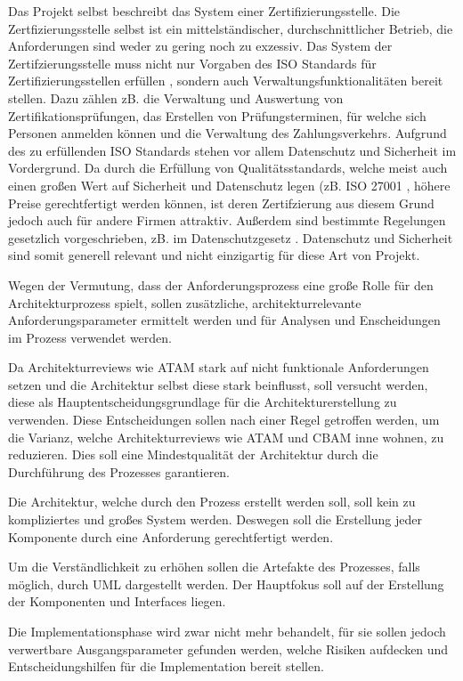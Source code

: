 Das Projekt selbst beschreibt das System einer Zertifizierungsstelle. Die Zertfizierungsstelle selbst ist ein mittelständischer, durchschnittlicher Betrieb, die Anforderungen sind weder zu gering noch zu exzessiv. Das System der Zertifzierungsstelle muss nicht nur Vorgaben des ISO Standards für Zertifizierungsstellen erfüllen \cite{ISO_CERT}, sondern auch Verwaltungsfunktionalitäten bereit stellen. Dazu zählen zB. die Verwaltung und Auswertung von Zertifikationsprüfungen, das Erstellen von Prüfungsterminen, für welche sich Personen anmelden können und die Verwaltung des Zahlungsverkehrs. Aufgrund des zu erfüllenden ISO Standards stehen vor allem Datenschutz und Sicherheit im Vordergrund. Da durch die Erfüllung von Qualitätsstandards, welche meist auch einen großen Wert auf Sicherheit und Datenschutz legen (zB. ISO 27001 \cite{ISO_SEC}, höhere Preise gerechtfertigt werden können, ist deren Zertifzierung aus diesem Grund jedoch auch für andere Firmen attraktiv. Außerdem sind bestimmte Regelungen gesetzlich vorgeschrieben, zB. im Datenschutzgesetz \cite[§ 14]{datenschutz}. Datenschutz und Sicherheit sind somit generell relevant und nicht einzigartig für diese Art von Projekt.

Wegen der Vermutung, dass der Anforderungsprozess eine große Rolle für den Architekturprozess spielt, sollen zusätzliche, architekturrelevante Anforderungsparameter ermittelt werden und für Analysen und Enscheidungen im Prozess verwendet werden.

Da Architekturreviews wie ATAM stark auf nicht funktionale Anforderungen setzen und die Architektur selbst diese stark beinflusst, soll versucht werden, diese als Hauptentscheidungsgrundlage für die Architekturerstellung zu verwenden. Diese Entscheidungen sollen nach einer Regel getroffen werden, um die Varianz, welche Architekturreviews wie ATAM und CBAM inne wohnen, zu reduzieren. Dies soll eine Mindestqualität der Architektur durch die Durchführung des Prozesses garantieren.

Die Architektur, welche durch den Prozess erstellt werden soll, soll kein zu kompliziertes und großes System werden. Deswegen soll die Erstellung jeder Komponente durch eine Anforderung gerechtfertigt werden.

Um die Verständlichkeit zu erhöhen sollen die Artefakte des Prozesses, falls möglich, durch UML dargestellt werden. Der Hauptfokus soll auf der Erstellung der Komponenten und Interfaces liegen.

Die Implementationsphase wird zwar nicht mehr behandelt, für sie sollen jedoch verwertbare Ausgangsparameter gefunden werden, welche Risiken aufdecken und Entscheidungshilfen für die Implementation bereit stellen.


